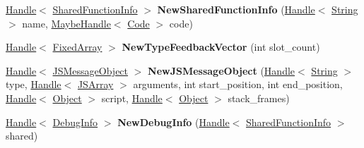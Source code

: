 \begin{DoxyCompactItemize}
\item 
\hypertarget{classv8_1_1internal_1_1_v8___f_i_n_a_l_aa19345e6eca9f0324ecd398d36d08fbd}{}\hyperlink{classv8_1_1internal_1_1_handle}{Handle}$<$ \hyperlink{classv8_1_1internal_1_1_shared_function_info}{Shared\+Function\+Info} $>$ {\bfseries New\+Shared\+Function\+Info} (\hyperlink{classv8_1_1internal_1_1_handle}{Handle}$<$ \hyperlink{classv8_1_1internal_1_1_string}{String} $>$ name, \hyperlink{classv8_1_1internal_1_1_maybe_handle}{Maybe\+Handle}$<$ \hyperlink{classv8_1_1internal_1_1_code}{Code} $>$ code)\label{classv8_1_1internal_1_1_v8___f_i_n_a_l_aa19345e6eca9f0324ecd398d36d08fbd}

\item 
\hypertarget{classv8_1_1internal_1_1_v8___f_i_n_a_l_a9cf422b3f6a48ad8c2ede39b7a9654b5}{}\hyperlink{classv8_1_1internal_1_1_handle}{Handle}$<$ \hyperlink{classv8_1_1internal_1_1_fixed_array}{Fixed\+Array} $>$ {\bfseries New\+Type\+Feedback\+Vector} (int slot\+\_\+count)\label{classv8_1_1internal_1_1_v8___f_i_n_a_l_a9cf422b3f6a48ad8c2ede39b7a9654b5}

\item 
\hypertarget{classv8_1_1internal_1_1_v8___f_i_n_a_l_ad62dbd34065e2749ae3e2912ef162334}{}\hyperlink{classv8_1_1internal_1_1_handle}{Handle}$<$ \hyperlink{classv8_1_1internal_1_1_j_s_message_object}{J\+S\+Message\+Object} $>$ {\bfseries New\+J\+S\+Message\+Object} (\hyperlink{classv8_1_1internal_1_1_handle}{Handle}$<$ \hyperlink{classv8_1_1internal_1_1_string}{String} $>$ type, \hyperlink{classv8_1_1internal_1_1_handle}{Handle}$<$ \hyperlink{classv8_1_1internal_1_1_j_s_array}{J\+S\+Array} $>$ arguments, int start\+\_\+position, int end\+\_\+position, \hyperlink{classv8_1_1internal_1_1_handle}{Handle}$<$ \hyperlink{classv8_1_1internal_1_1_object}{Object} $>$ script, \hyperlink{classv8_1_1internal_1_1_handle}{Handle}$<$ \hyperlink{classv8_1_1internal_1_1_object}{Object} $>$ stack\+\_\+frames)\label{classv8_1_1internal_1_1_v8___f_i_n_a_l_ad62dbd34065e2749ae3e2912ef162334}

\item 
\hypertarget{classv8_1_1internal_1_1_v8___f_i_n_a_l_a9fdbde77658d03959d989c4d8559be92}{}\hyperlink{classv8_1_1internal_1_1_handle}{Handle}$<$ \hyperlink{classv8_1_1internal_1_1_debug_info}{Debug\+Info} $>$ {\bfseries New\+Debug\+Info} (\hyperlink{classv8_1_1internal_1_1_handle}{Handle}$<$ \hyperlink{classv8_1_1internal_1_1_shared_function_info}{Shared\+Function\+Info} $>$ shared)\label{classv8_1_1internal_1_1_v8___f_i_n_a_l_a9fdbde77658d03959d989c4d8559be92}


\end{DoxyCompactItemize}
